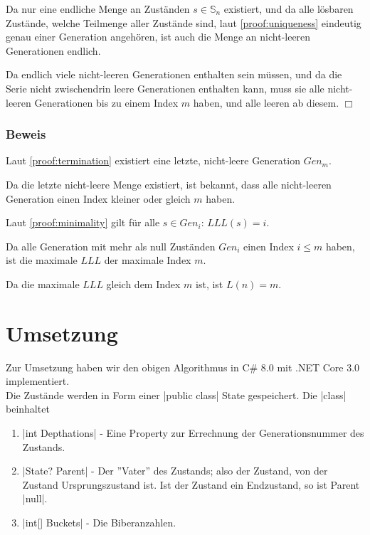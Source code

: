 \documentclass[a4paper,10pt,ngerman]{scrartcl}
\begin{document}
Da nur eine endliche Menge an Zuständen \(s \in \mathbb{S}_n\) existiert, und da alle lösbaren Zustände, welche Teilmenge aller Zustände sind, laut \cref{proof:uniqueness} eindeutig genau einer Generation angehören, ist auch die Menge an nicht-leeren Generationen endlich.

Da endlich viele nicht-leeren Generationen enthalten sein müssen, und da die Serie nicht zwischendrin leere Generationen enthalten kann, muss sie alle nicht-leeren Generationen bis zu einem Index \(m\) haben, und alle leeren ab diesem. \(\Box\)

\subsubsection{Beweis}

Laut \cref{proof:termination} existiert eine letzte, nicht-leere Generation \(Gen_m\).

Da die letzte nicht-leere Menge existiert, ist bekannt, dass alle nicht-leeren Generation einen Index kleiner oder gleich \(m\) haben.

Laut \cref{proof:minimality} gilt für alle \(s \in Gen_i\): \(LLL(s) = i\).

Da alle Generation mit mehr als null Zuständen \(Gen_i\) einen Index \(i \leq m\) haben, ist die maximale \(LLL\) der maximale Index \(m\).

Da die maximale \(LLL\) gleich dem Index \(m\) ist, ist \(L(n) = m\).

\section{Umsetzung}

Zur Umsetzung haben wir den obigen Algorithmus in C\# 8.0 mit
.NET Core 3.0 implementiert.\\
Die Zustände werden in Form einer |public class| State gespeichert.
Die |class| beinhaltet

\begin{enumerate}
    \item |int Depthations| - 
        Eine Property zur Errechnung der Generationsnummer des Zustands.
    \item |State? Parent| - 
        Der ''Vater'' des Zustands; also der Zustand, von der Zustand Ursprungszustand ist.
        Ist der Zustand ein Endzustand, so ist Parent |null|.
    \item |int[] Buckets| - Die Biberanzahlen.
\end{enumerate}
\end{document}
